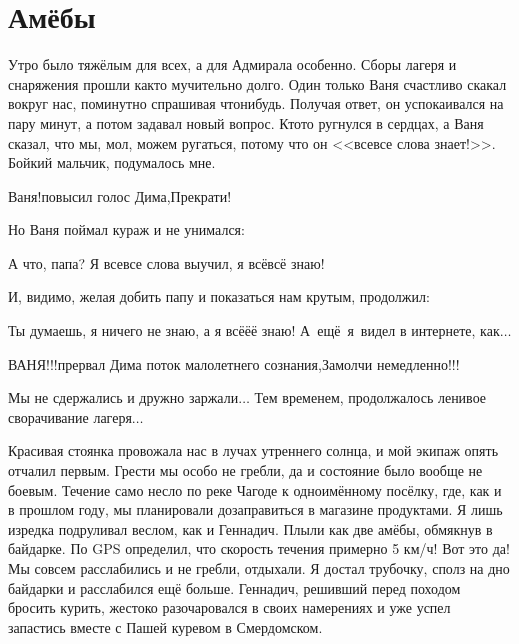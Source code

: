 \chapter{Амёбы} 
\vepsianrose

Утро было тяжёлым для всех, а для Адмирала особенно. Сборы лагеря и снаряжения прошли как\sdash то мучительно долго. Один только Ваня счастливо скакал вокруг нас, поминутно спрашивая что\sdash нибудь. Получая ответ, он успокаивался на пару минут, а потом задавал новый вопрос. Кто\sdash то ругнулся в сердцах, а Ваня сказал, что мы, мол, можем ругаться, потому что он <<все\sdash все слова знает!>>. Бойкий мальчик, подумалось мне. 


\diagdash Ваня!\mdash повысил голос Дима,\mdash Прекрати! 

Но Ваня поймал кураж и не унимался: 

\diagdash А что, папа? Я все\sdash все слова выучил, я всё\sdash всё знаю! 

И, видимо, желая добить папу и показаться нам крутым, продолжил: 

\diagdash Ты думаешь, я ничего не знаю, а я всё\sdash ё\sdash ё знаю! А~ещё~я~видел в интернете, как$\ldots$ 

\diagdash ВАНЯ!!!\mdash прервал Дима поток малолетнего сознания,\mdash Замолчи немедленно!!! 

Мы не сдержались и  дружно заржали$\ldots$ Тем временем, продолжалось ленивое сворачивание лагеря$\ldots$ 

Красивая стоянка провожала нас в лучах утреннего солнца, и мой экипаж опять отчалил первым. Грести мы особо не гребли, да и состояние было вообще не боевым. Течение само несло по реке Чагоде к одноимённому посёлку, где, как и в прошлом году, мы планировали дозаправиться в магазине продуктами. Я лишь изредка подруливал веслом, как и Геннадич. Плыли как две амёбы, обмякнув в байдарке. По GPS определил, что скорость течения примерно 5 км/ч! Вот это да! Мы совсем расслабились и не гребли, отдыхали. Я достал трубочку, сполз на дно байдарки и расслабился ещё больше. Геннадич, решивший перед походом бросить курить, жестоко разочаровался в своих намерениях и уже успел запастись вместе с Пашей куревом в Смердомском.

